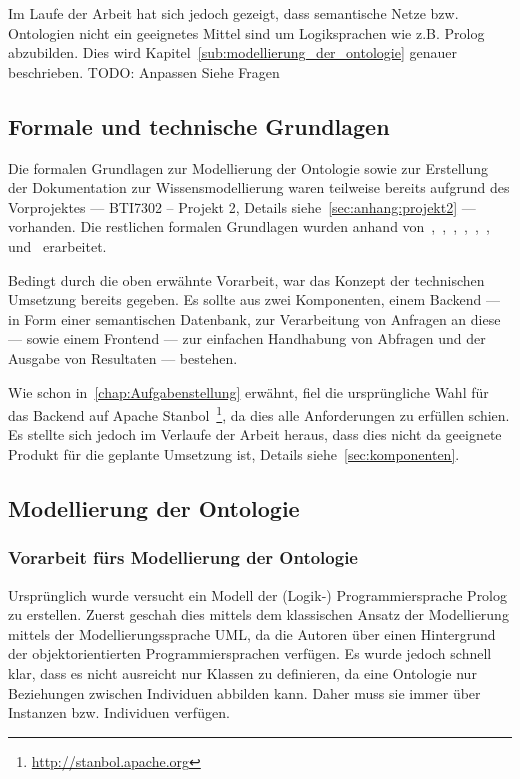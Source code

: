 Im Laufe der Arbeit hat sich jedoch gezeigt, dass semantische Netze bzw. Ontologien nicht ein geeignetes Mittel sind um Logiksprachen wie z.B. Prolog abzubilden. Dies wird Kapitel~\autoref{sub:modellierung_der_ontologie} genauer beschrieben.
TODO: Anpassen Siehe Fragen

\subsection{Formale und technische Grundlagen}
\label{sub:formale_und_technische_grundlagen}
Die formalen Grundlagen zur Modellierung der Ontologie sowie zur Erstellung der Dokumentation zur Wissensmodellierung waren teilweise bereits aufgrund des Vorprojektes --- BTI7302 -- Projekt 2, Details siehe~\autoref{sec:anhang:projekt2} --- vorhanden. Die restlichen formalen Grundlagen wurden anhand von~\cite{IspekOntoBedeutung},~\cite{ISpekOntoGeschichte},~\cite{w3sparql_querylang},~\cite{w3sparql_overview},~\cite{w3rdf_syntax},~\cite{w3rdf},~\cite{w3owl} und~\cite{swrl} erarbeitet.

Bedingt durch die oben erwähnte Vorarbeit, war das Konzept der technischen Umsetzung bereits gegeben. Es sollte aus zwei Komponenten, einem Backend --- in Form einer semantischen Datenbank, zur Verarbeitung von Anfragen an diese --- sowie einem Frontend --- zur einfachen Handhabung von Abfragen und der Ausgabe von Resultaten --- bestehen.

Wie schon in~\autoref{chap:Aufgabenstellung} erwähnt, fiel die ursprüngliche Wahl für das Backend auf Apache Stanbol~\footnote{\url{http://stanbol.apache.org}}, da dies alle Anforderungen zu erfüllen schien. Es stellte sich jedoch im Verlaufe der Arbeit heraus, dass dies nicht da geeignete Produkt für die geplante Umsetzung ist, Details siehe~\autoref{sec:komponenten}.

\subsection{Modellierung der Ontologie}
\label{sub:modellierung_der_ontologie}

\subsubsection{Vorarbeit fürs Modellierung der Ontologie}
\label{sub:modellierung_der_ontologie_vorarbeit}
Ursprünglich wurde versucht ein Modell der (Logik-) Programmiersprache Prolog zu erstellen. Zuerst geschah dies mittels dem klassischen Ansatz der Modellierung mittels der Modellierungssprache UML, da die Autoren über einen Hintergrund der objektorientierten Programmiersprachen verfügen. Es wurde jedoch schnell klar, dass es nicht ausreicht nur Klassen zu definieren, da eine Ontologie nur Beziehungen zwischen Individuen abbilden kann. Daher muss sie immer über Instanzen bzw. Individuen verfügen.

